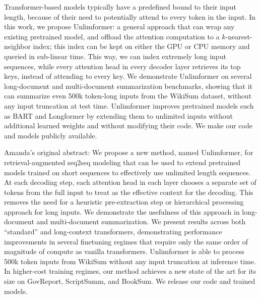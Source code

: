 Transformer-based models typically have a predefined bound to their input length, because of their need to potentially attend to every token in the input. 
In this work, we propose Unlimformer: a general approach that can wrap any existing pretrained model, and offload the attention computation to a $k$-nearest-neighbor index; this index can be kept on either the GPU or CPU memory and queried in sub-linear time. 
This way, we can index extremely long input sequences, while every attention head in every decoder layer retrieves its top keys, instead of attending to every key.
We demonstrate Unlimformer on several long-document and multi-document summarization benchmarks, showing that it can summarize even 500k token-long inputs from the WikiSum dataset, without any input truncation at test time.
Unlimformer improves pretrained models such as BART \cite{lewis2020bart} and Longformer \cite{beltagy2020longformer} by extending them to unlimited inputs without additional learned weights and without modifying their code. 
We make our code and models publicly available.


Amanda's original abstract:
We propose a new method, named Unlimformer, for retrieval-augmented seq2seq modeling that can be used to extend pretrained models trained on short sequences to effectively use unlimited length sequences. 
At each decoding step, each attention head in each layer chooses a separate set of tokens from the full input to treat as the effective context for the decoding.
This removes the need for a heuristic pre-extraction step or hierarchical processing approach for long inputs. 
We demonstrate the usefulness of this approach in long-document and multi-document summarization.
We present results across both ``standard'' and long-context transformers, demonstrating performance improvements in several finetuning regimes that require only the same order of magnitude of compute as vanilla transformers.
Unlimformer is able to process 500k token inputs from WikiSum without any input truncation at inference time. 
In higher-cost training regimes, our method achieves a new state of the art for its size on GovReport, ScriptSumm, and BookSum.
We release our code and trained models. 